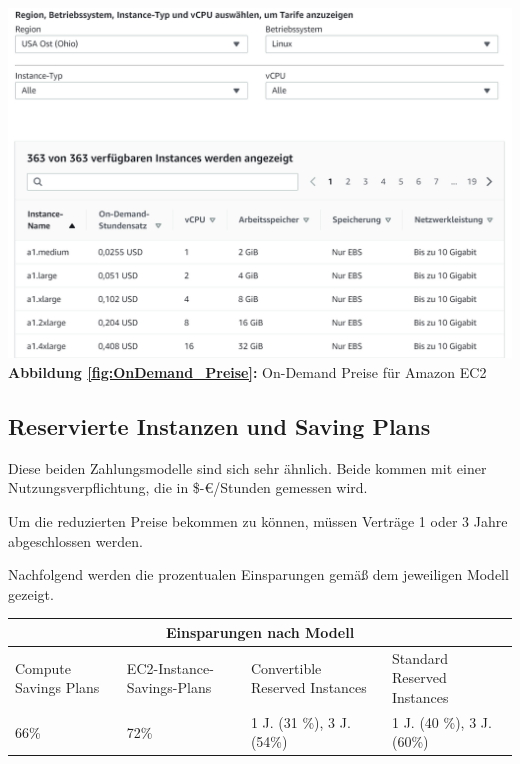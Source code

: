 \begin{center}
      \includegraphics[scale=0.4]{sources/On-Demand-Pläne für Amazon EC2}\label{fig:OnDemand_Preise}\\
      \textbf{Abbildung \autoref{fig:OnDemand_Preise}:} On-Demand Preise für Amazon EC2
      {\cite{AMZ01}}
\end{center}
\subsection{Reservierte Instanzen und Saving Plans}
\begin{flushleft}
Diese beiden Zahlungsmodelle sind sich sehr ähnlich. Beide kommen mit einer Nutzungsverpflichtung, die in \$-€/Stunden gemessen wird.

Um die reduzierten Preise bekommen zu können, müssen Verträge 1 oder 3 Jahre abgeschlossen werden.

Nachfolgend werden die prozentualen Einsparungen gemäß dem jeweiligen Modell gezeigt.
\end{flushleft}

\begin{table}[h!]
    \centering
\begin{tabular}{ |p{3cm}||p{3cm}|p{3.6cm}|p{3.6cm}|  }
    \hline
    \multicolumn{4}{|c|}{Einsparungen nach Modell}                                                   \\
    \hline
    Compute Savings Plans & EC2-Instance-Savings-Plans & Convertible Reserved Instances & Standard Reserved Instances \\
    \hline
    66\%& 72\%
    & 1 J. (31 \%), 3 J. (54\%)  & 1 J. (40 \%), 3 J.(60\%)
    \\
    \hline
\end{tabular}
\end{table}

